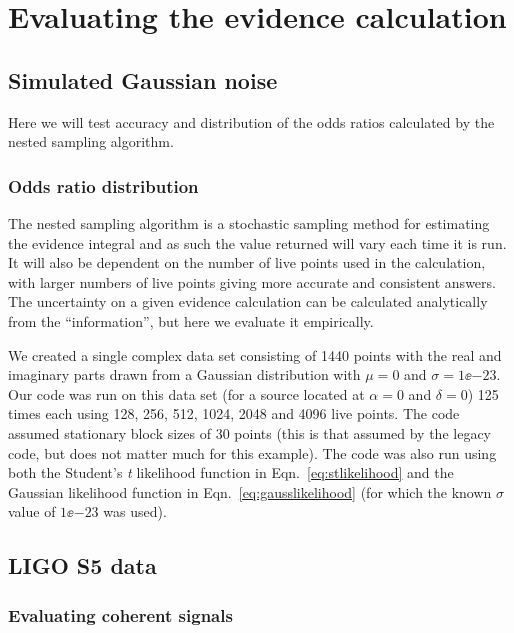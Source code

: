 \section{Evaluating the evidence calculation}

\subsection{Simulated Gaussian noise}

Here we will test accuracy and distribution of the odds ratios calculated by the nested sampling
algorithm.

\subsubsection{Odds ratio distribution}

The nested sampling algorithm is a stochastic sampling method for estimating the evidence integral
and as such the value returned will vary each time it is run. It will also be dependent on the
number of live points used in the calculation, with larger numbers of live points giving more
accurate and consistent answers. The uncertainty on a given evidence calculation can be calculated
analytically \citep[see][]{Skilling:2006} from the ``information'', but here we evaluate it
empirically.

We created a single complex data set consisting of 1440 points with the real and imaginary parts drawn
from a Gaussian distribution with $\mu = 0$ and $\sigma = 1\ee{-23}$. Our code was run on this data set
(for a source located at $\alpha = 0$ and $\delta = 0$) 125 times each using 128, 256, 512, 1024, 2048 
and 4096 live points. The code assumed stationary block sizes of 30 points (this is that assumed by
the legacy code, but does not matter much for this example). The code was also run using both the 
Student's {\it t} likelihood function in Eqn.~\ref{eq:stlikelihood} and the Gaussian likelihood 
function in Eqn.~\ref{eq:gausslikelihood} (for which the known $\sigma$ value of $1\ee{-23}$ was used).

\subsection{LIGO S5 data}

\subsubsection{Evaluating coherent signals}

